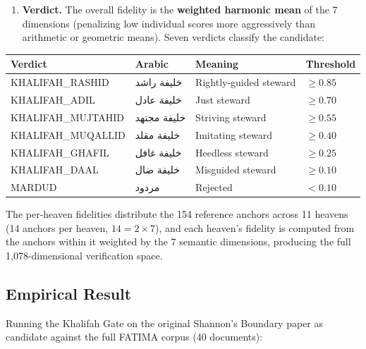 \documentclass[11pt,a4paper]{article}
\begin{document}
\begin{enumerate}[nosep,start=3]
    \item \textbf{Verdict.} The overall fidelity is the \textbf{weighted harmonic mean} of the 7 dimensions (penalizing low individual scores more aggressively than arithmetic or geometric means). Seven verdicts classify the candidate:
\end{enumerate}

\begin{center}
\small
\begin{tabular}{llll}
\toprule
\textbf{Verdict} & \textbf{Arabic} & \textbf{Meaning} & \textbf{Threshold} \\
\midrule
KHALIFAH\_RASHID & خليفة راشد & Rightly-guided steward & $\geq 0.85$ \\
KHALIFAH\_ADIL & خليفة عادل & Just steward & $\geq 0.70$ \\
KHALIFAH\_MUJTAHID & خليفة مجتهد & Striving steward & $\geq 0.55$ \\
KHALIFAH\_MUQALLID & خليفة مقلد & Imitating steward & $\geq 0.40$ \\
KHALIFAH\_GHAFIL & خليفة غافل & Heedless steward & $\geq 0.25$ \\
KHALIFAH\_DAAL & خليفة ضال & Misguided steward & $\geq 0.10$ \\
MARDUD & مردود & Rejected & $< 0.10$ \\
\bottomrule
\end{tabular}
\end{center}

The per-heaven fidelities distribute the 154 reference anchors across 11 heavens (14 anchors per heaven, $14 = 2 \times 7$), and each heaven's fidelity is computed from the anchors within it weighted by the 7 semantic dimensions, producing the full 1,078-dimensional verification space.

\subsection{Empirical Result}

Running the Khalifah Gate on the original Shannon's Boundary paper as candidate against the full FATIMA corpus (40 documents):
\end{document}
